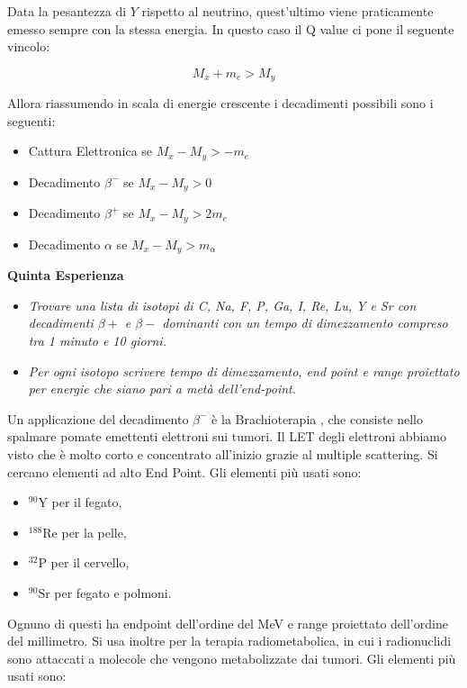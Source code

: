 Data la pesantezza di $Y$ rispetto al neutrino, quest'ultimo viene praticamente emesso sempre con la stessa energia. In questo caso il Q value ci pone il seguente vincolo:

\begin{equation}
M_x+m_e>M_y
\end{equation}

Allora riassumendo in scala di energie crescente i decadimenti possibili sono i seguenti:

\begin{itemize}
\item Cattura Elettronica se $M_x-M_y>-m_e$
\item Decadimento $\beta^-$ se $M_x-M_y>0$
\item Decadimento $\beta^+$ se $M_x-M_y>2m_e$
\item Decadimento $\alpha$ se $M_x-M_y>m_{\alpha}$
\end{itemize}

\textbf{Quinta Esperienza}

\begin{itemize}
\item \emph{Trovare una lista di isotopi di C, Na, F, P, Ga, I, Re, Lu, Y e Sr con decadimenti $\beta+$ e $\beta-$ dominanti con un tempo di dimezzamento compreso tra 1 minuto e 10 giorni.}
\item \emph{Per ogni isotopo scrivere tempo di dimezzamento, end point e range proiettato per energie che siano pari a metà dell'end-point.}
\end{itemize}



Un applicazione del decadimento $\beta^-$ è la Brachioterapia \cite{Brachioterapia}, che consiste nello spalmare pomate emettenti elettroni sui tumori. Il LET degli elettroni abbiamo visto che è molto corto e concentrato all'inizio grazie al multiple scattering. Si cercano elementi ad alto End Point. Gli elementi più usati sono:
\begin{itemize}
\item $^{90}\text{Y}$ per il fegato,
\item $^{188}\text{Re}$ per la pelle,
\item $^{32}\text{P}$ per il cervello,
\item $^{90}\text{Sr}$ per fegato e polmoni.
\end{itemize}

Ognuno di questi ha endpoint dell'ordine del MeV e range proiettato dell'ordine del millimetro.
Si usa inoltre per la terapia radiometabolica, in cui i radionuclidi sono attaccati a molecole che vengono metabolizzate dai tumori. Gli elementi più usati sono:

